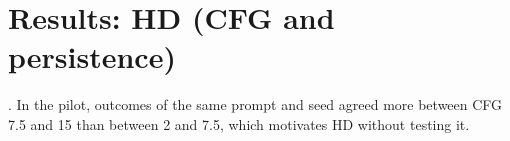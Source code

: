 \section{Results: HD (CFG and persistence)}\label{sec:resHD}
. In the pilot, outcomes of the same prompt and seed agreed more between CFG 7.5 and 15 than between 2 and 7.5, which motivates HD without testing it.

